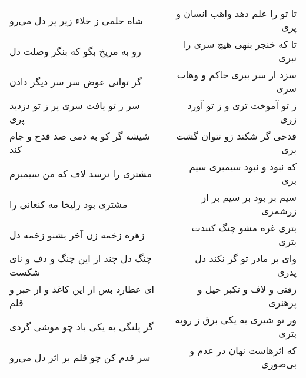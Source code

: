 \begin{center}
\begin{longtable}{l p{0.5cm} r}
\\
شاه حلمی ز خلاء زیر پر دل می‌رو
&&
تا تو را علم دهد واهب انسان و پری
\\
رو به مریخ بگو که بنگر وصلت دل
&&
تا که خنجر بنهی هیچ سری را نبری
\\
گر توانی عوض سر سر دیگر دادن
&&
سزد ار سر ببری حاکم و وهاب سری
\\
سر ز تو یافت سری پر ز تو دزدید پری
&&
ز تو آموخت تری و ز تو آورد زری
\\
شیشه گر کو به دمی صد قدح و جام کند
&&
قدحی گر شکند زو نتوان گشت بری
\\
مشتری را نرسد لاف که من سیمبرم
&&
که نبود و نبود سیمبری سیم بری
\\
مشتری بود زلیخا مه کنعانی را
&&
سیم بر بود بر سیم بر از زرشمری
\\
زهره زخمه زن آخر بشنو زخمه دل
&&
بتری غره مشو چنگ کنندت بتری
\\
چنگ دل چند از این چنگ و دف و نای شکست
&&
وای بر مادر تو گر نکند دل پدری
\\
ای عطارد بس از این کاغذ و از حبر و قلم
&&
زفتی و لاف و تکبر حیل و پرهنری
\\
گر پلنگی به یکی باد چو موشی گردی
&&
ور تو شیری به یکی برق ز روبه بتری
\\
سر قدم کن چو قلم بر اثر دل می‌رو
&&
که اثرهاست نهان در عدم و بی‌صوری
\\
\end{longtable}
\end{center}
